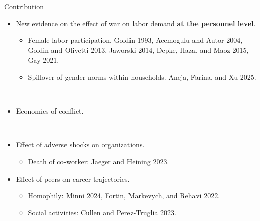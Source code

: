 \begin{frame}{Contribution}
    \begin{itemize}
        \item New evidence on the effect of war on labor demand \textbf{at the personnel level}.

        \begin{itemize}
            \item Female labor participation.
            \color{gray}
            \small Goldin 1993, Acemogulu and Autor 2004, Goldin and Olivetti 2013, Jaworski 2014, Depke, Haza, and Maoz 2015, Gay 2021.
            \color{black}
            \normalfont
            \item Spillover of gender norms within households.
            \color{gray}
            Aneja, Farina, and Xu 2025.
        \end{itemize}

        \
        \item Economics of conflict.

        \
        
        \item Effect of adverse shocks on organizations.
        \begin{itemize}
            \item Death of co-worker: \color{gray}Jaeger and Heining 2023.
        \end{itemize}
        \item Effect of peers on career trajectories.
        \begin{itemize}
            \item Homophily: \color{gray}Minni 2024, Fortin, Markevych, and Rehavi 2022.\color{black}
            \item Social activities: \color{gray}Cullen and Perez-Truglia 2023.
        \end{itemize}
        
    \end{itemize}
\end{frame}